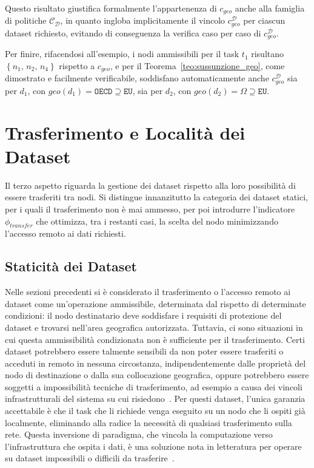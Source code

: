 Questo risultato giustifica formalmente l'appartenenza di $c_{geo}$ anche alla famiglia di politiche $\mathcal{C_D}$, in quanto ingloba implicitamente il vincolo $c_{geo}^{\mathcal{D}}$ per ciascun dataset richiesto, evitando di conseguenza la verifica caso per caso di $c_{geo}^{\mathcal{D}}$.

Per finire, rifacendosi all'esempio, i nodi ammissibili per il task $t_1$ risultano $\left\{ n_1,\, n_2,\, n_4 \right\}$ rispetto a $c_{geo}$, e per il Teorema~\ref{teo:sussunzione_geo}, come dimostrato e facilmente verificabile, soddisfano automaticamente anche $c_{geo}^{\mathcal{D}}$ sia per $d_1$, con $geo(d_1) = \mathtt{OECD} \supseteq \mathtt{EU}$, sia per $d_2$, con $geo(d_2) = \Omega \supseteq \mathtt{EU}$.

 
\section{Trasferimento e Località dei Dataset}
\label{sec:trasferimento_localita_dataset}

Il terzo aspetto riguarda la gestione dei dataset rispetto alla loro possibilità di essere trasferiti tra nodi. Si distingue innanzitutto la categoria dei dataset statici, per i quali il trasferimento non è mai ammesso, per poi introdurre l'indicatore $\phi_{transfer}$ che ottimizza, tra i restanti casi, la scelta del nodo minimizzando l'accesso remoto ai dati richiesti.


\subsection{Staticità dei Dataset}
\label{subsec:residenza_dataset}
 
Nelle sezioni precedenti si è considerato il trasferimento o l'accesso remoto ai dataset come un'operazione ammissibile, determinata dal rispetto di determinate condizioni: il nodo destinatario deve soddisfare i requisiti di protezione del dataset e trovarsi nell'area geografica autorizzata. Tuttavia, ci sono situazioni in cui questa ammissibilità condizionata non è sufficiente per il trasferimento. Certi dataset potrebbero essere talmente sensibili da non poter essere trasferiti o acceduti in remoto in nessuna circostanza, indipendentemente dalle proprietà del nodo di destinazione o dalla sua collocazione geografica, oppure potrebbero essere soggetti a impossibilità tecniche di trasferimento, ad esempio a causa dei vincoli infrastrutturali del sistema su cui risiedono~\cite{bringing-computation-moea}. Per questi dataset, l'unica garanzia accettabile è che il task che li richiede venga eseguito su un nodo che li ospiti già localmente, eliminando alla radice la necessità di qualsiasi trasferimento sulla rete. Questa inversione di paradigma, che vincola la computazione verso l'infrastruttura che ospita i dati, è una soluzione nota in letteratura per operare su dataset impossibili o difficili da trasferire~\cite{paradigm-non-transferable-dataset, beyond-the-wall-ndp}.

